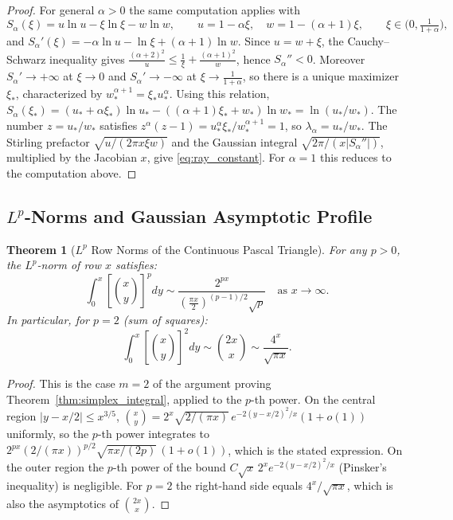 \documentclass[11pt,a4paper]{article}
\theoremstyle{plain}
\newtheorem{theorem}{Theorem}[section]
\theoremstyle{definition}
\theoremstyle{remark}
\numberwithin{equation}{section}
\begin{document}
\begin{proof}
For general $\alpha > 0$ the same computation applies with
\[
S_\alpha(\xi) = u\ln u - \xi\ln\xi - w\ln w, \qquad u = 1 - \alpha\xi, \quad w = 1 - (\alpha+1)\xi, \qquad \xi \in \big(0, \tfrac{1}{1+\alpha}\big),
\]
and $S_\alpha'(\xi) = -\alpha\ln u - \ln\xi + (\alpha+1)\ln w$. Since $u = w + \xi$, the Cauchy--Schwarz inequality gives $\frac{(\alpha+2)^2}{u} \le \frac{1}{\xi} + \frac{(\alpha+1)^2}{w}$, hence $S_\alpha'' < 0$. Moreover $S_\alpha' \to +\infty$ at $\xi \to 0$ and $S_\alpha' \to -\infty$ at $\xi \to \frac{1}{1+\alpha}$, so there is a unique maximizer $\xi_*$, characterized by $w_*^{\alpha+1} = \xi_* u_*^\alpha$. Using this relation, $S_\alpha(\xi_*) = (u_* + \alpha\xi_*)\ln u_* - ((\alpha+1)\xi_* + w_*)\ln w_* = \ln(u_*/w_*)$. The number $z = u_*/w_*$ satisfies $z^\alpha(z-1) = u_*^\alpha\xi_*/w_*^{\alpha+1} = 1$, so $\lambda_\alpha = u_*/w_*$. The Stirling prefactor $\sqrt{u/(2\pi x\xi w)}$ and the Gaussian integral $\sqrt{2\pi/(x|S_\alpha''|)}$, multiplied by the Jacobian $x$, give \eqref{eq:ray_constant}. For $\alpha = 1$ this reduces to the computation above.
\end{proof}

\subsection{\texorpdfstring{$L^p$}{Lp}-Norms and Gaussian Asymptotic Profile}

\begin{theorem}[$L^p$ Row Norms of the Continuous Pascal Triangle]
\label{thm:lp_rows}
For any $p > 0$, the $L^p$-norm of row $x$ satisfies:
\begin{equation}
\int_0^x \left[\binom{x}{y}\right]^p dy \sim \frac{2^{px}}{\left(\frac{\pi x}{2}\right)^{(p-1)/2}\sqrt{p}} \quad \text{as } x \to \infty.
\end{equation}
In particular, for $p=2$ (sum of squares):
\begin{equation}
\int_0^x \left[\binom{x}{y}\right]^2 dy \sim \binom{2x}{x} \sim \frac{4^x}{\sqrt{\pi x}}.
\end{equation}
\end{theorem}
\begin{proof}
This is the case $m = 2$ of the argument proving Theorem~\ref{thm:simplex_integral}, applied to the $p$-th power. On the central region $|y - x/2| \le x^{3/5}$, $\binom{x}{y} = 2^x\sqrt{2/(\pi x)}\,e^{-2(y - x/2)^2/x}(1 + o(1))$ uniformly, so the $p$-th power integrates to $2^{px}(2/(\pi x))^{p/2}\sqrt{\pi x/(2p)}\,(1 + o(1))$, which is the stated expression. On the outer region the $p$-th power of the bound $C\sqrt{x}\,2^x e^{-2(y-x/2)^2/x}$ (Pinsker's inequality) is negligible. For $p = 2$ the right-hand side equals $4^x/\sqrt{\pi x}$, which is also the asymptotics of $\binom{2x}{x}$.
\end{proof}
\end{document}
